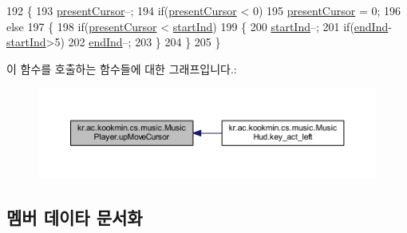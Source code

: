 \begin{DoxyCode}
192   \{
193     \hyperlink{classkr_1_1ac_1_1kookmin_1_1cs_1_1music_1_1_music_player_aed823f56c3e5597d294d4f66a2d2fc54}{presentCursor}--;
194     \textcolor{keywordflow}{if}(\hyperlink{classkr_1_1ac_1_1kookmin_1_1cs_1_1music_1_1_music_player_aed823f56c3e5597d294d4f66a2d2fc54}{presentCursor} < 0)
195       \hyperlink{classkr_1_1ac_1_1kookmin_1_1cs_1_1music_1_1_music_player_aed823f56c3e5597d294d4f66a2d2fc54}{presentCursor} = 0;
196     \textcolor{keywordflow}{else}
197     \{
198       \textcolor{keywordflow}{if}(\hyperlink{classkr_1_1ac_1_1kookmin_1_1cs_1_1music_1_1_music_player_aed823f56c3e5597d294d4f66a2d2fc54}{presentCursor} < \hyperlink{classkr_1_1ac_1_1kookmin_1_1cs_1_1music_1_1_music_player_af154b8f09fc298427ccfb1d0e7c94447}{startInd})
199       \{
200         \hyperlink{classkr_1_1ac_1_1kookmin_1_1cs_1_1music_1_1_music_player_af154b8f09fc298427ccfb1d0e7c94447}{startInd}--;
201         \textcolor{keywordflow}{if}(\hyperlink{classkr_1_1ac_1_1kookmin_1_1cs_1_1music_1_1_music_player_ad162359e29d80d26914c27b6318901eb}{endInd}-\hyperlink{classkr_1_1ac_1_1kookmin_1_1cs_1_1music_1_1_music_player_af154b8f09fc298427ccfb1d0e7c94447}{startInd}>5)
202           \hyperlink{classkr_1_1ac_1_1kookmin_1_1cs_1_1music_1_1_music_player_ad162359e29d80d26914c27b6318901eb}{endInd}--;
203       \}
204     \}
205   \}
\end{DoxyCode}


이 함수를 호출하는 함수들에 대한 그래프입니다.\+:\nopagebreak
\begin{figure}[H]
\begin{center}
\leavevmode
\includegraphics[width=350pt]{classkr_1_1ac_1_1kookmin_1_1cs_1_1music_1_1_music_player_a3dd6eb813563681e38a8dd9c981e886e_icgraph}
\end{center}
\end{figure}




\subsection{멤버 데이타 문서화}
\hypertarget{classkr_1_1ac_1_1kookmin_1_1cs_1_1music_1_1_music_player_a2614e5b1bf00c55b57e08354bcb6be19}{}
